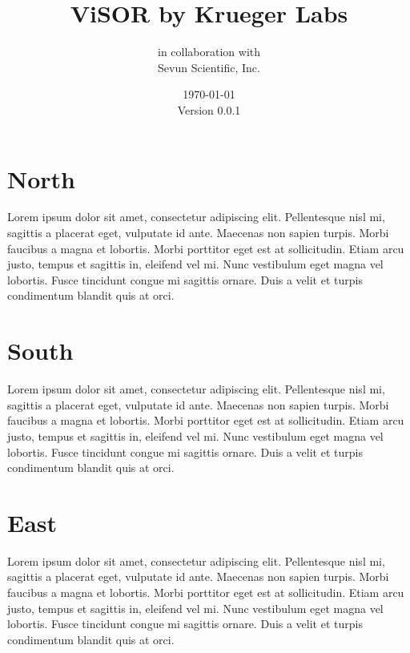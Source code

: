 \documentclass[letterpaper]{report}
\begin{document}
	\title{ViSOR by Krueger Labs}
	\author{in collaboration with \\ Sevun Scientific, Inc.}
	\date{\today \\ Version 0.0.1}
\maketitle


\newpage
\begin{versionhistory}
\end{versionhistory}

\newpage
\tableofcontents

\newpage
\listoffigures

\newpage
\listoftables

\newpage
{}
\setcounter{page}{1}

\chapter{North}
Lorem ipsum dolor sit amet, consectetur adipiscing elit. Pellentesque nisl mi, sagittis a placerat eget, vulputate id ante. Maecenas non sapien turpis. Morbi faucibus a magna et lobortis. Morbi porttitor eget est at sollicitudin. Etiam arcu justo, tempus et sagittis in, eleifend vel mi. Nunc vestibulum eget magna vel lobortis. Fusce tincidunt congue mi sagittis ornare. Duis a velit et turpis condimentum blandit quis at orci.
\newpage
\chapter{South}
Lorem ipsum dolor sit amet, consectetur adipiscing elit. Pellentesque nisl mi, sagittis a placerat eget, vulputate id ante. Maecenas non sapien turpis. Morbi faucibus a magna et lobortis. Morbi porttitor eget est at sollicitudin. Etiam arcu justo, tempus et sagittis in, eleifend vel mi. Nunc vestibulum eget magna vel lobortis. Fusce tincidunt congue mi sagittis ornare. Duis a velit et turpis condimentum blandit quis at orci.
\chapter{East}
Lorem ipsum dolor sit amet, consectetur adipiscing elit. Pellentesque nisl mi, sagittis a placerat eget, vulputate id ante. Maecenas non sapien turpis. Morbi faucibus a magna et lobortis. Morbi porttitor eget est at sollicitudin. Etiam arcu justo, tempus et sagittis in, eleifend vel mi. Nunc vestibulum eget magna vel lobortis. Fusce tincidunt congue mi sagittis ornare. Duis a velit et turpis condimentum blandit quis at orci.
\end{document}
